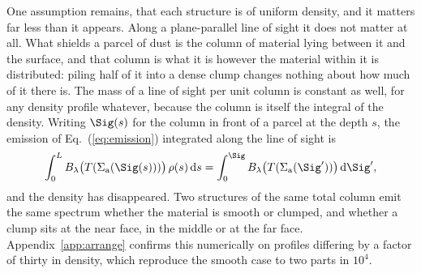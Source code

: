 %
%



One assumption remains, that each structure is of uniform density, and it matters far less than it appears. Along a
plane-parallel line of sight it does not matter at all. What shields a parcel of dust is the column of material lying between it
and the surface, and that column is what it is however the material within it is distributed: piling half of it into a dense clump
changes nothing about how much of it there is. The mass of a line of sight per unit column is constant as well, for any density
profile whatever, because the column is itself the integral of the density. Writing $\Sig(s)$ for the column in front of a parcel
at the depth $s$, the emission of Eq.~(\ref{eq:emission}) integrated along the line of sight is
\begin{equation}
   \int_0^L B_\lambda\big(T(\Sigma_{\rm a}(\Sig(s)))\big)\,\rho(s)\,{\rm d}s
   = \int_0^{\Sig} B_\lambda\big(T(\Sigma_{\rm a}(\Sig'))\big)\,{\rm d}\Sig' ,
\label{eq:invariance}
\end{equation}
and the density has disappeared. Two structures of the same total column emit the same spectrum whether the material is smooth or
clumped, and whether a clump sits at the near face, in the middle or at the far face. Appendix~\ref{app:arrange} confirms this
numerically on profiles differing by a factor of thirty in density, which reproduce the smooth case to two parts in
$10^{4}$.

